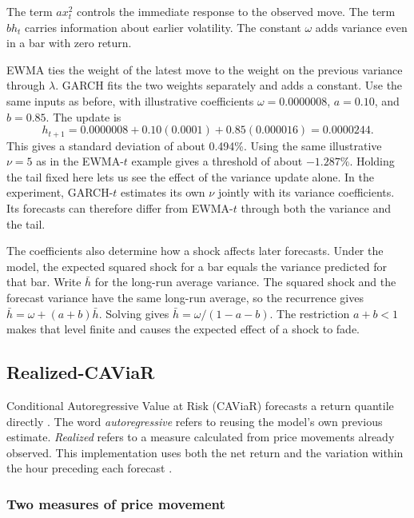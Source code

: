 \documentclass[
	12pt,				%
	openright,			%
	twoside,			%
	a4paper,
	chapter=TITLE,
	english				%
	]{abntex2}
\begin{document}
The term $a x_t^2$ controls the immediate response to the observed move. The term $b h_t$ carries information about earlier volatility. The constant $\omega$ adds variance even in a bar with zero return.

EWMA ties the weight of the latest move to the weight on the previous variance through $\lambda$. GARCH fits the two weights separately and adds a constant. Use the same inputs as before, with illustrative coefficients $\omega=0.0000008$, $a=0.10$, and $b=0.85$. The update is
\begin{equation*}
  h_{t+1}=0.0000008+0.10(0.0001)+0.85(0.000016)
         =0.0000244.
\end{equation*}
This gives a standard deviation of about 0.494\%. Using the same illustrative $\nu=5$ as in the EWMA-$t$ example gives a threshold of about $-1.287\%$. Holding the tail fixed here lets us see the effect of the variance update alone. In the experiment, GARCH-$t$ estimates its own $\nu$ jointly with its variance coefficients. Its forecasts can therefore differ from EWMA-$t$ through both the variance and the tail.

The coefficients also determine how a shock affects later forecasts. Under the model, the expected squared shock for a bar equals the variance predicted for that bar. Write $\bar h$ for the long-run average variance. The squared shock and the forecast variance have the same long-run average, so the recurrence gives $\bar h=\omega+(a+b)\bar h$. Solving gives $\bar h=\omega/(1-a-b)$. The restriction $a+b<1$ makes that level finite and causes the expected effect of a shock to fade.

\subsection{Realized-CAViaR}

Conditional Autoregressive Value at Risk (CAViaR) forecasts a return quantile directly \cite{engle-manganelli-2004}. The word \emph{autoregressive} refers to reusing the model's own previous estimate. \emph{Realized} refers to a measure calculated from price movements already observed. This implementation uses both the net return and the variation within the hour preceding each forecast \cite{barndorff-nielsen-shephard-2002,wang-gerlach-chen-2018}.

\subsubsection{Two measures of price movement}
\end{document}
